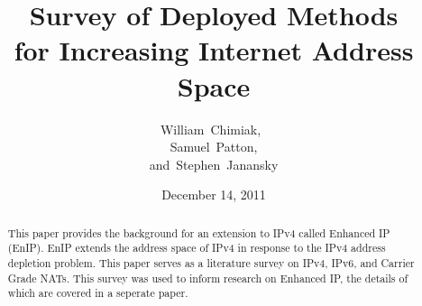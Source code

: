 \documentclass[letterpaper,10pt]{IEEEtranTCOM}
\begin{document}
\title{Survey of Deployed Methods\\for Increasing Internet Address Space}

\author{William~Chimiak,~\\
    Samuel~Patton, \\and~Stephen~Janansky}



\date{December 14, 2011}


\maketitle

\begin{abstract}
This paper provides the background for an extension to IPv4 called 
Enhanced IP (EnIP).  EnIP extends the address space of IPv4 in 
response to the IPv4 address depletion problem. This paper serves as 
a literature survey on IPv4, IPv6, and Carrier Grade NATs.  This survey was
used to inform research on Enhanced IP, the details of which are 
covered in a seperate paper.

\end{abstract}




\end{document}
